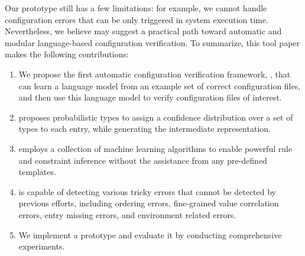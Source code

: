 Our \app prototype still has a few limitations:
for example, we cannot handle configuration errors that can be only
triggered in system execution time.
Nevertheless, we believe \app may suggest a practical path
toward automatic and modular language-based configuration verification.
To summarize, this tool paper makes the following contributions:



\begin{enumerate}

\item We propose the first automatic configuration verification
framework, \app, that can learn a language model from an example set of 
correct configuration files, and then use this language model to verify 
configuration files of interest.
 
\item \app proposes probabilistic types to assign a confidence 
distribution over a set of types to each entry, 
while generating the intermediate representation. 

\item \app employs a collection of machine learning algorithms to 
enable powerful rule and constraint inference without the assistance 
from any pre-defined templates.

\item \app is capable of detecting various tricky errors that cannot
be detected by previous efforts,
including ordering errors, fine-grained value correlation errors, 
entry missing errors, and environment related errors. 

\item We implement a \app prototype and evaluate it by
conducting comprehensive experiments.

\end{enumerate}
